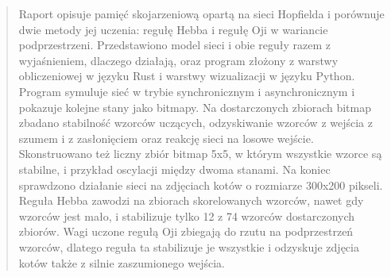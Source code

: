 \begin{abstract}
Raport opisuje pamięć skojarzeniową opartą na sieci Hopfielda i porównuje dwie metody jej uczenia: regułę Hebba i regułę Oji w wariancie podprzestrzeni. Przedstawiono model sieci i obie reguły razem z wyjaśnieniem, dlaczego działają, oraz program złożony z warstwy obliczeniowej w języku Rust i warstwy wizualizacji w języku Python. Program symuluje sieć w trybie synchronicznym i asynchronicznym i pokazuje kolejne stany jako bitmapy. Na dostarczonych zbiorach bitmap zbadano stabilność wzorców uczących, odzyskiwanie wzorców z wejścia z szumem i z zasłonięciem oraz reakcję sieci na losowe wejście. Skonstruowano też liczny zbiór bitmap \mbox{5x5}, w którym wszystkie wzorce są stabilne, i przykład oscylacji między dwoma stanami. Na koniec sprawdzono działanie sieci na zdjęciach kotów o rozmiarze \mbox{300x200} pikseli. Reguła Hebba zawodzi na zbiorach skorelowanych wzorców, nawet gdy wzorców jest mało, i stabilizuje tylko 12 z 74 wzorców dostarczonych zbiorów. Wagi uczone regułą Oji zbiegają do rzutu na podprzestrzeń wzorców, dlatego reguła ta stabilizuje je wszystkie i odzyskuje zdjęcia kotów także z silnie zaszumionego wejścia.
\end{abstract}
